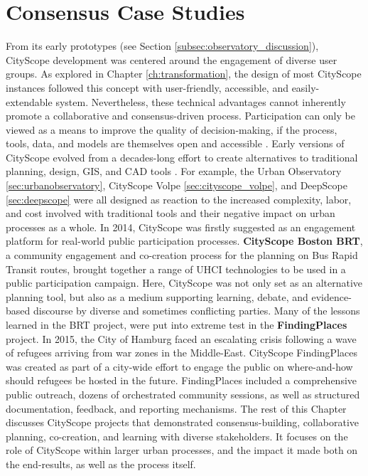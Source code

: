 {    \section{Consensus Case Studies}
     {
      From its early prototypes (see Section \eqref{subsec:observatory_discussion}), CityScope development was centered around the engagement of diverse user groups. As explored in Chapter \eqref{ch:transformation}, the design of most CityScope instances followed this concept with user-friendly, accessible, and easily-extendable system. Nevertheless, these technical advantages cannot inherently promote a collaborative and consensus-driven process. Participation can only be viewed as a means to improve the quality of decision-making, if the process, tools, data, and models are themselves open and accessible \cite{Innes2016, innes2010planning}.
      \newline
      Early versions of CityScope evolved from a decades-long effort to create alternatives to traditional planning, design, GIS, and CAD tools \cite{ben-joseph2001, ishii2004bringing, negroponte1975soft, Sutherland1963}. For example, the Urban Observatory \eqref{sec:urbanobservatory}, CityScope Volpe \eqref{sec:cityscope_volpe}, and DeepScope \eqref{sec:deepscope} were all designed as reaction to the increased complexity, labor, and cost involved with traditional tools and their negative impact on urban processes as a whole.
      In 2014, CityScope was firstly suggested as an engagement platform for real-world public participation processes. \textbf{CityScope Boston BRT}, a community engagement and co-creation process for the planning on Bus Rapid Transit routes, brought together a range of UHCI technologies to be used in a public participation campaign. Here, CityScope was not only set as an alternative planning tool, but also as a medium supporting learning, debate, and evidence-based discourse by diverse and sometimes conflicting parties.
      \newline
      Many of the lessons learned in the BRT project, were put into extreme test in the \textbf{FindingPlaces} project. In 2015, the City of Hamburg faced an escalating crisis following a wave of refugees arriving from war zones in the Middle-East. CityScope FindingPlaces was created as part of a city-wide effort to engage the public on where-and-how should refugees be hosted in the future. FindingPlaces included a comprehensive public outreach, dozens of orchestrated community sessions, as well as structured documentation, feedback, and reporting mechanisms.
      \newline
      The rest of this Chapter discusses CityScope projects that demonstrated consensus-building, collaborative planning, co-creation, and learning with diverse stakeholders. It focuses on the role of CityScope within larger urban processes, and the impact it made both on the end-results, as well as the process itself.
     }

}

